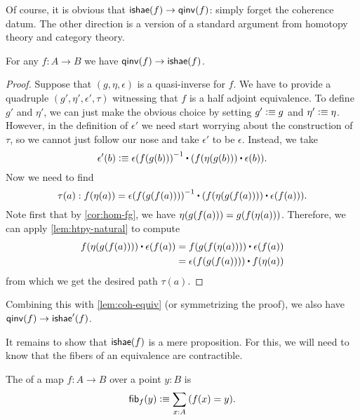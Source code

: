 Of course, it is obvious that $\mathsf{ishae}(f) \to\mathsf{qinv}(f)$: simply forget the coherence datum.
The other direction is a version of a standard argument from homotopy theory and category theory.

\begin{thm}\label{thm:equiv-iso-adj}
  For any $f:A\to B$ we have $\mathsf{qinv}(f)\to\mathsf{ishae}(f)$.
\end{thm}
\begin{proof}
Suppose that $(g,\eta,\epsilon)$ is a quasi-inverse for $f$. We have to provide
a quadruple $(g',\eta',\epsilon',\tau)$ witnessing that $f$ is a half adjoint equivalence. To
define $g'$ and $\eta'$, we can just make the obvious choice by setting $g'
\vcentcolon\equiv g$ and $\eta'\vcentcolon\equiv \eta$. However, in the definition of $\epsilon'$ we
need start worrying about the construction of $\tau$, so we cannot just follow our nose
and take $\epsilon'$ to be $\epsilon$. Instead, we take
\begin{equation*}
\epsilon'(b) \defeq \opp{\epsilon(f(g(b)))}\ct (\ap{f}{\eta(g(b))}\ct \epsilon(b)).
\end{equation*}
Now we need to find
\begin{equation*}
\tau(a): \ap{f}{\eta(a)}=\opp{\epsilon(f(g(f(a))))}\ct (\ap{f}{\eta(g(f(a)))}\ct \epsilon(f(a))).
\end{equation*}
Note first that by \cref{cor:hom-fg}, we have
$\eta(g(f(a)))={g}\mathopen{}\left({{f}\mathopen{}\left({\eta(a)}\right)\mathclose{}}\right)\mathclose{}$. Therefore, we can apply
\cref{lem:htpy-natural} to compute
\begin{align*}
\ap{f}{\eta(g(f(a)))}\ct \epsilon(f(a))
& = \ap{f}{\ap{g}{\ap{f}{\eta(a)}}}\ct \epsilon(f(a))\\
& = \epsilon(f(g(f(a))))\ct \ap{f}{\eta(a)}
\end{align*}
from which we get the desired path $\tau(a)$.
\end{proof}

Combining this with \cref{lem:coh-equiv} (or symmetrizing the proof), we also have $\mathsf{qinv}(f)\to\mathsf{ishae}'(f)$.

It remains to show that $\mathsf{ishae}(f)$ is a mere proposition.
For this, we will need to know that the fibers of an equivalence are contractible.

\begin{defn}\label{defn:homotopy-fiber}
  The 
  of a map $f:A\to B$ over a point $y:B$ is
  \[ \hfib f y \defeq \sm{x:A} (f(x) = y).\]
\end{defn}

